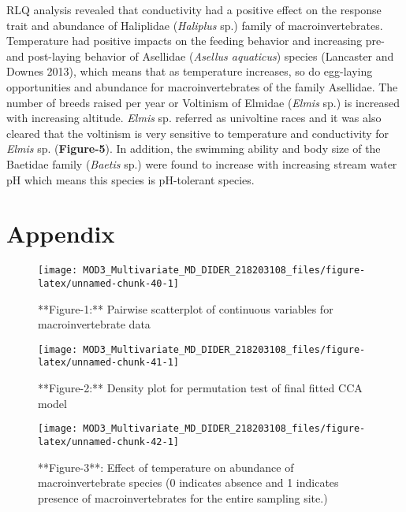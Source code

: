 \documentclass[
]{article}
\begin{document}
RLQ analysis revealed that conductivity had a positive effect on the
response trait and abundance of Haliplidae (\emph{Haliplus} sp.) family
of macroinvertebrates. Temperature had positive impacts on the feeding
behavior and increasing pre- and post-laying behavior of Asellidae
(\emph{Asellus aquaticus}) species (Lancaster and Downes 2013), which
means that as temperature increases, so do egg-laying opportunities and
abundance for macroinvertebrates of the family Asellidae. The number of
breeds raised per year or Voltinism of Elmidae (\emph{Elmis} sp.) is
increased with increasing altitude. \emph{Elmis} sp. referred as
univoltine races and it was also cleared that the voltinism is very
sensitive to temperature and conductivity for \emph{Elmis} sp.
(\textbf{Figure-5}). In addition, the swimming ability and body size of
the Baetidae family (\emph{Baetis} sp.) were found to increase with
increasing stream water pH which means this species is pH-tolerant
species.

\hypertarget{appendix}{%
\section{Appendix}\label{appendix}}

\begin{figure}

{\centering \texttt{[image: MOD3\_Multivariate\_MD\_DIDER\_218203108\_files/figure-latex/unnamed-chunk-40-1]} 

}

\caption{ **Figure-1:** Pairwise scatterplot of continuous variables for macroinvertebrate data}\label{fig:unnamed-chunk-40}
\end{figure}

\begin{figure}

{\centering \texttt{[image: MOD3\_Multivariate\_MD\_DIDER\_218203108\_files/figure-latex/unnamed-chunk-41-1]} 

}

\caption{ **Figure-2:** Density plot for permutation test of final fitted CCA model}\label{fig:unnamed-chunk-41}
\end{figure}

\begin{figure}

{\centering \texttt{[image: MOD3\_Multivariate\_MD\_DIDER\_218203108\_files/figure-latex/unnamed-chunk-42-1]} 

}

\caption{**Figure-3**: Effect of temperature on abundance of macroinvertebrate species (0 indicates absence and 1 indicates presence of macroinvertebrates for the entire sampling site.)}\label{fig:unnamed-chunk-42}
\end{figure}
\end{document}
